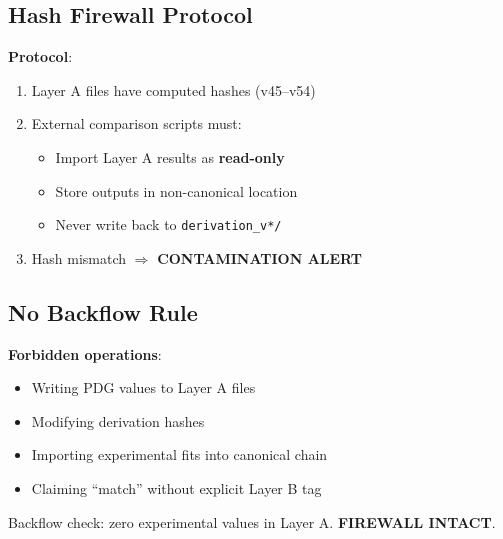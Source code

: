 \documentclass[11pt,a4paper]{article}
\begin{document}
\subsection{Hash Firewall Protocol}
\label{app:hash-firewall}

\begin{hashbox}
\label{box:hash-firewall}
\textbf{Protocol}:
\begin{enumerate}
    \item Layer A files have computed hashes (v45--v54)
    \item External comparison scripts must:
    \begin{itemize}
        \item Import Layer A results as \textbf{read-only}
        \item Store outputs in non-canonical location
        \item Never write back to \texttt{derivation\_v*/}
    \end{itemize}
    \item Hash mismatch $\Rightarrow$ \textbf{CONTAMINATION ALERT}
\end{enumerate}
\end{hashbox}

\subsection{No Backflow Rule}
\label{app:no-backflow}

\begin{forbiddenbox}[No Backflow]
\label{box:no-backflow}
\textbf{Forbidden operations}:
\begin{itemize}
    \item Writing PDG values to Layer A files
    \item Modifying derivation hashes
    \item Importing experimental fits into canonical chain
    \item Claiming ``match'' without explicit Layer B tag
\end{itemize}
\end{forbiddenbox}

\begin{trapbox}
\label{trap:rt16}
Backflow check: zero experimental values in Layer A. \textbf{FIREWALL INTACT}.
\end{trapbox}

\end{document}
